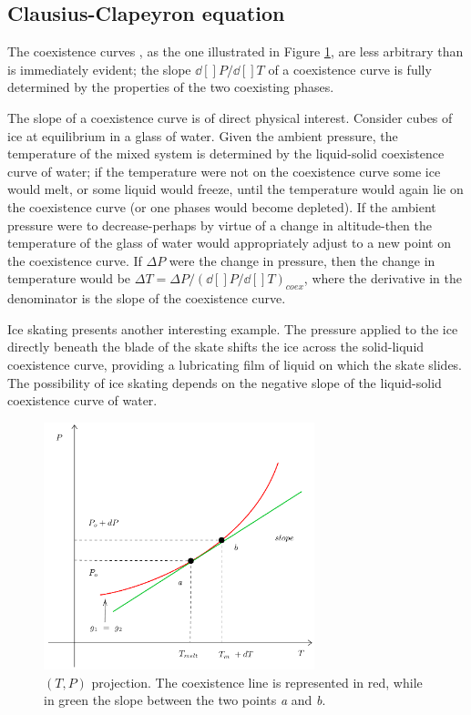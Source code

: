\documentclass[../main/main.tex]{subfiles}
\begin{document}
\subsection{Clausius-Clapeyron equation}
The coexistence curves \cite{3_lesson_2}, as the one illustrated in Figure  \ref{fig:3_1}, are less arbitrary than is immediately evident; the slope \( \dd[]{P} /\dd[]{T}   \) of a coexistence curve is fully determined by the properties of the two coexisting phases.

The slope of a coexistence curve is of direct physical interest. Consider cubes of ice at equilibrium in a glass of water. Given the ambient pressure, the temperature of the mixed system is determined by the liquid-solid coexistence curve of water; if the temperature were not on the coexistence curve some ice would melt, or some liquid would freeze, until the temperature would again lie on the coexistence curve (or one phases would become depleted). If the ambient pressure were to decrease-perhaps by virtue of a change in altitude-then the temperature of the glass of water would appropriately adjust to a new point on the coexistence curve. If \( \Delta P \) were the change in pressure, then the change in temperature would be \( \Delta T = \Delta P / (\dd[]{P} /\dd[]{T})_{coex} \), where the derivative in the denominator is the slope of the coexistence curve.

\begin{remark}
Ice skating presents another interesting example. The pressure applied to the ice directly beneath the blade of the skate shifts the ice across the solid-liquid coexistence curve, providing a lubricating film of liquid on which the skate slides. The possibility of ice skating depends on the negative slope of the liquid-solid coexistence curve of water.
\end{remark}
\begin{figure}[h!]
\centering
\includegraphics[width=0.7\textwidth]{../lessons/3_image/2.pdf}
\caption{\label{fig:3_1} \( (T,P) \) projection. The coexistence line is represented in red, while in green the slope between the two points \emph{a} and \emph{b}.}
\end{figure}
\end{document}
